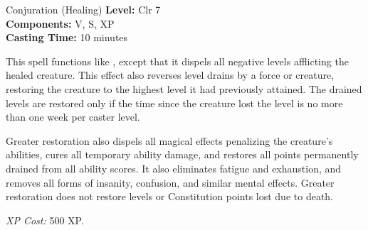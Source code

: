 {Conjuration (Healing)}
{
	\textbf{Level:}
	Clr 7\\
	\textbf{Components:}
	V, S, XP\\
	\textbf{Casting Time:}
	10 minutes\\
}
{
	This spell functions like , except that it dispels all negative levels afflicting the healed creature. This effect also reverses level drains by a force or creature, restoring the creature to the highest level it had previously attained. The drained levels are restored only if the time since the creature lost the level is no more than one week per caster level.

	Greater restoration also dispels all magical effects penalizing the creature's abilities, cures all temporary ability damage, and restores all points permanently drained from all ability scores. It also eliminates fatigue and exhaustion, and removes all forms of insanity, confusion, and similar mental effects. Greater restoration does not restore levels or Constitution points lost due to death.

	\textit{XP Cost:}
	500 XP.

}
